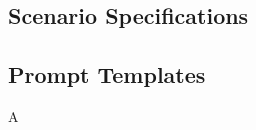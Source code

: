 \documentclass[lettersize,journal]{IEEEtran}
\begin{document}
\subsection{Scenario Specifications}
\label{app:scenario_specs}



\subsection{Prompt Templates}
\label{app:prompts}

A




\end{document}
